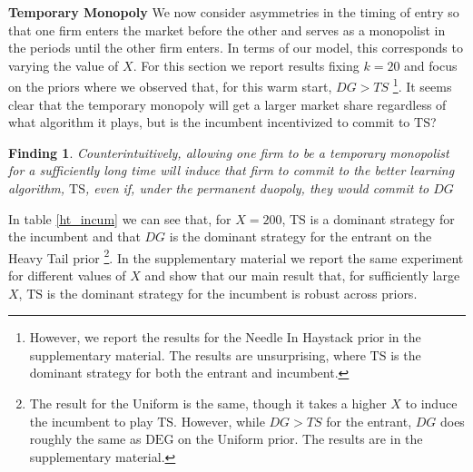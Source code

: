 \documentclass[letterpaper]{article}
\theoremstyle{definition}
\newtheorem{finding}{Finding}
\newcommand{\TS}{\mathrm{TS}}
\newcommand{\DEG}{\mathrm{DEG}}
\begin{document}
\textbf{Temporary Monopoly} We now consider asymmetries in the timing of entry so that one firm enters the market before the other and serves as a monopolist in the periods until the other firm enters. In terms of our model, this corresponds to varying the value of $X$. For this section we report results fixing $k = 20$ and focus on the priors where we observed that, for this warm start, $DG > TS$ \footnote{However, we report the results for the Needle In Haystack prior in the supplementary material. The results are unsurprising, where $\TS$ is the dominant strategy for both the entrant and incumbent.}. It seems clear that the temporary monopoly will get a larger market share regardless of what algorithm it plays, but is the incumbent incentivized to commit to $\TS$?

\begin{finding}
\textit{Counterintuitively, allowing one firm to be a temporary monopolist for a sufficiently long time will induce that firm to commit to the better learning algorithm, $\TS$, even if, under the permanent duopoly, they would commit to $DG$}
\end{finding}

In table \ref{ht_incum} we can see that, for $X = 200$, $\TS$ is a dominant strategy for the incumbent and that $DG$ is the dominant strategy for the entrant on the Heavy Tail prior \footnote{The result for the Uniform is the same, though it takes a higher $X$ to induce the incumbent to play $\TS$. However, while $DG > TS$ for the entrant, $DG$ does roughly the same as $\DEG$ on the Uniform prior. The results are in the supplementary material.}. In the supplementary material we report the same experiment for different values of $X$ and show that our main result that, for sufficiently large $X$, $\TS$ is the dominant strategy for the incumbent is robust across priors.
\end{document}
